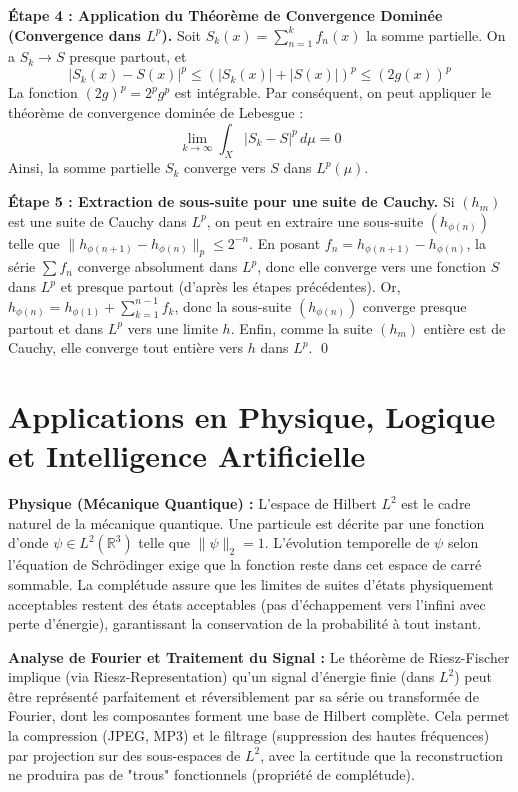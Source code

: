 \documentclass[11pt,a4paper]{article}
\begin{document}
\textbf{Étape 4 : Application du Théorème de Convergence Dominée (Convergence dans $L^p$).}
Soit $S_k(x) = \sum_{n=1}^k f_n(x)$ la somme partielle.
On a $S_k \to S$ presque partout, et
$$ |S_k(x) - S(x)|^p \le (|S_k(x)| + |S(x)|)^p \le (2g(x))^p $$
La fonction $(2g)^p = 2^p g^p$ est intégrable.
Par conséquent, on peut appliquer le théorème de convergence dominée de Lebesgue :
$$ \lim_{k \to \infty} \int_X |S_k - S|^p \, d\mu = 0 $$
Ainsi, la somme partielle $S_k$ converge vers $S$ dans $L^p(\mu)$.

\textbf{Étape 5 : Extraction de sous-suite pour une suite de Cauchy.}
Si $(h_m)$ est une suite de Cauchy dans $L^p$, on peut en extraire une sous-suite $(h_{\phi(n)})$ telle que $\|h_{\phi(n+1)} - h_{\phi(n)}\|_p \le 2^{-n}$. En posant $f_n = h_{\phi(n+1)} - h_{\phi(n)}$, la série $\sum f_n$ converge absolument dans $L^p$, donc elle converge vers une fonction $S$ dans $L^p$ et presque partout (d'après les étapes précédentes). Or, $h_{\phi(n)} = h_{\phi(1)} + \sum_{k=1}^{n-1} f_k$, donc la sous-suite $(h_{\phi(n)})$ converge presque partout et dans $L^p$ vers une limite $h$. Enfin, comme la suite $(h_m)$ entière est de Cauchy, elle converge tout entière vers $h$ dans $L^p$. \qed

\section{Applications en Physique, Logique et Intelligence Artificielle}

\textbf{Physique (Mécanique Quantique) :}
L'espace de Hilbert $L^2$ est le cadre naturel de la mécanique quantique. Une particule est décrite par une fonction d'onde $\psi \in L^2(\mathbb{R}^3)$ telle que $\|\psi\|_2 = 1$. L'évolution temporelle de $\psi$ selon l'équation de Schrödinger exige que la fonction reste dans cet espace de carré sommable. La complétude assure que les limites de suites d'états physiquement acceptables restent des états acceptables (pas d'échappement vers l'infini avec perte d'énergie), garantissant la conservation de la probabilité à tout instant.

\textbf{Analyse de Fourier et Traitement du Signal :}
Le théorème de Riesz-Fischer implique (via Riesz-Representation) qu'un signal d'énergie finie (dans $L^2$) peut être représenté parfaitement et réversiblement par sa série ou transformée de Fourier, dont les composantes forment une base de Hilbert complète. Cela permet la compression (JPEG, MP3) et le filtrage (suppression des hautes fréquences) par projection sur des sous-espaces de $L^2$, avec la certitude que la reconstruction ne produira pas de "trous" fonctionnels (propriété de complétude).
\end{document}
